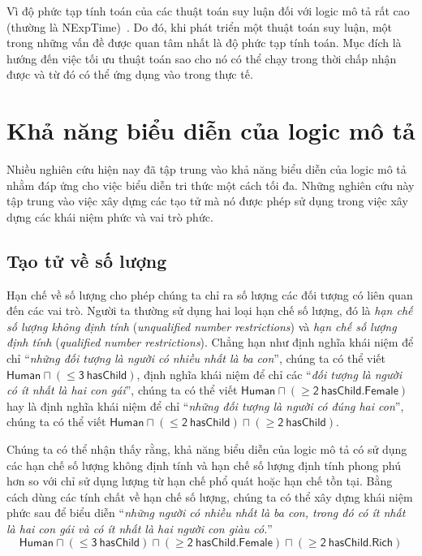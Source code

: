 \documentclass[12pt,a4paper]{report}
\newcommand{\mand}{\sqcap}
\newcommand{\NEXPTIME}{{\sc NExpTime}\xspace}
\begin{document}
Vì độ phức tạp tính toán của các thuật toán suy luận đối với logic mô tả rất cao (thường là \NEXPTIME)~\cite{ref:Horrock00, ref:Horrock01, ref:Tobies}. Do đó, khi phát triển một thuật toán suy luận, một trong những vấn đề được quan tâm nhất là độ phức tạp tính toán. Mục đích là hướng đến việc tối ưu thuật toán sao cho nó có thể chạy trong thời chấp nhận được và từ đó có thể ứng dụng vào trong thực tế.

\section{Khả năng biểu diễn của logic mô tả}\label{sec:ExpressiveDL}
Nhiều nghiên cứu hiện nay đã tập trung vào khả năng biểu diễn của logic mô tả nhằm đáp ứng cho việc biểu diễn tri thức một cách tối đa. Những nghiên cứu này tập trung vào việc xây dựng các tạo tử mà nó được phép sử dụng trong việc xây dựng các khái niệm phức và vai trò phức.

\subsection{Tạo tử về số lượng}\label{subsec:Counting}
Hạn chế về số lượng cho phép chúng ta chỉ ra số lượng các đối tượng có liên quan đến các vai trò. Người ta thường sử dụng hai loại hạn chế số lượng, đó là \textit{hạn chế số lượng không định tính} (\textit{unqualified number restrictions}) và \textit{hạn chế số lượng định tính} (\textit{qualified number restrictions}). Chẳng hạn như định nghĩa khái niệm để chỉ ``\textit{những đối tượng là người có nhiều nhất là ba con}'', chúng ta có thể viết $\mathsf{Human \mand (\leq 3\ hasChild)}$, định nghĩa khái niệm để chỉ các ``\textit{đối tượng là người có ít nhất là hai con gái}'', chúng ta có thể viết $\mathsf{Human \mand (\geq 2\ hasChild.Female)}$ hay là định nghĩa khái niệm để chỉ ``\textit{những đối tượng là người có đúng hai con}'', chúng ta có thể viết $\mathsf{Human \mand (\leq 2\ hasChild) \mand (\geq 2\ hasChild)}$.

Chúng ta có thể nhận thấy rằng, khả năng biểu diễn của logic mô tả có sử dụng các hạn chế số lượng không định tính và hạn chế số lượng định tính phong phú hơn so với chỉ sử dụng lượng từ hạn chế phổ quát hoặc hạn chế tồn tại. Bằng cách dùng các tính chất về hạn chế số lượng, chúng ta có thể xây dựng khái niệm phức sau để biểu diễn ``\textit{những người có nhiều nhất là ba con, trong đó có ít nhất là hai con gái và có ít nhất là hai người con giàu có.}''
$$\mathsf{Human \mand (\leq 3\ hasChild) \mand (\geq 2\ hasChild.Female) \mand (\geq 2\ hasChild.Rich)}$$
\end{document}
